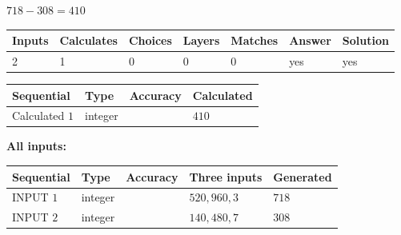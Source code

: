 \documentclass{ctexart}
\begin{document}
 

$ %
718 -  %
308=   %
410$
 
 
\noindent{}
 
 

 
   
   
   
   
\noindent\begin{tabular}{|l|l|l|l|l|l|l|}
 \hline
Inputs & Calculates & Choices & Layers & Matches & Answer & Solution \\ \hline
 2  & 
 1  & 
 0
  & 
 0  & 
 0  & 
  yes & 
  yes 
  \\ \hline
 \end{tabular}
   
   
   
   
\noindent{}
   
   
  
  
\noindent\begin{tabular}{|l|l|l|l|}
\hline
 Sequential & Type & Accuracy & Calculated \\ 
\hline
 
 
  Calculated $  1 $ & integer &  & 
  $ 410 $ 
 \\  \hline  
 \end{tabular}
   
   
   
   
\noindent\vspace{0.1in}\hspace{-0.08in} {\textbf{\Large{All inputs: }}}
   
   
  
  
\noindent\begin{tabular}{|l|l|l|l|l|}
\hline
 Sequential & Type & Accuracy & Three inputs & Generated \\ 
\hline
 
 
  INPUT $  1 $ & integer &  & $
 520
 , 
 960
 , 
 3
 $ & $ 718 $ 
 \\  \hline  
 
 
  INPUT $  2 $ & integer &  & $
 140
 , 
 480
 , 
 7
 $ & $ 308 $ 
 \\  \hline  
 \end{tabular}
   
   
   
   
   
   
 \vspace{0.2in}
 
\end{document}
